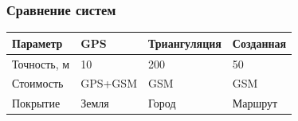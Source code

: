 \documentclass{beamer}
\begin{document}


\begin{frame}[fragile]
	\frametitle{Сравнение систем}
	\begin{tabular}{|p{}|p{}|p{}|p{}|}
		\hline
		{\bf{}Параметр} & {\bf{}GPS} & {\bf{}Триангуляция} & {\bf{}Созданная} \\
		\hline
		Точность, м & 10 & 200 & 50 \\
		\hline
		Стоимость & GPS+GSM & GSM & GSM \\
		\hline
		Покрытие & Земля & Город & Маршрут \\
		\hline
	\end{tabular}
\end{frame}
\end{document}
